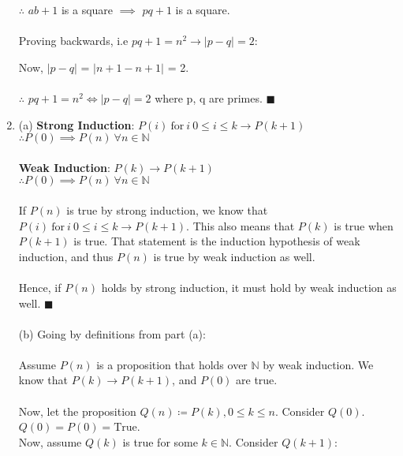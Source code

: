 \documentclass[a4paper]{article}
\begin{document}
\begin{enumerate}
    $\therefore$ $ab + 1$ is a square $\implies$ $pq + 1$ is a square. \\
    \\  
    Proving backwards, i.e $pq + 1 = n^2 \rightarrow |p-q| = 2$:

    Now, $|p-q|$ = $|n+1 - n+1|$ = 2. \\
    \\
    $\therefore$ $pq + 1 = n^2 \Leftrightarrow |p-q| = 2$ where p, q are primes. $\blacksquare$\\

    \item (a) \textbf{Strong Induction}: $P(i)\ \text{for}\ i\ 0 \leq i \leq k \rightarrow P(k + 1)$\\
    $\therefore P(0) \implies P(n)\ \forall n \in \mathbb{N}$  \\
    \\
    \textbf{Weak Induction}: $P(k) \rightarrow P(k + 1)$  \\
    $\therefore P(0) \implies P(n)\ \forall n \in \mathbb{N}$  \\
    \\
    If $P(n)$ is true by strong induction, we know that $P(i)\ \text{for}\ i\ 0 \leq i \leq k \rightarrow P(k + 1)$. This also means that $P(k)$ is true when $P(k+1)$ is true. That statement is the induction hypothesis of weak induction, and thus $P(n)$ is true by weak induction as well. \\
    \\
    Hence, if $P(n)$ holds by strong induction, it must hold by weak induction as well. $\blacksquare$\\ 
    \\
    (b) Going by definitions from part (a):\\
    \\
    Assume $P(n)$ is a proposition that holds over $\mathbb{N}$ by weak induction. We know that $P(k) \rightarrow P(k + 1)$, and $P(0)$ are true.\\ 
    \\
    Now, let the proposition $Q(n) \coloneqq P(k), 0 \leq k \leq n$. Consider $Q(0)$. $Q(0) = P(0) = \text{True}$. \\ 
    Now, assume $Q(k)$ is true for some $k \in \mathbb{N}$. Consider $Q(k+1)$:


\end{enumerate}
\end{document}
